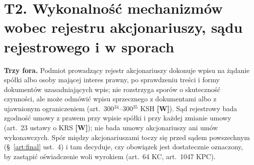 \documentclass[12pt,a4paper]{report}
\newcommand{\Wiar}[1]{\textbf{[#1]}}
\begin{document}
\section*{T2. Wykonalność mechanizmów wobec rejestru akcjonariuszy, sądu rejestrowego i w sporach}

\textbf{Trzy fora.} Podmiot prowadzący rejestr akcjonariuszy dokonuje wpisu na żądanie spółki albo osoby mającej interes prawny, po sprawdzeniu treści i formy dokumentów uzasadniających wpis; nie rozstrzyga sporów o skuteczność czynności, ale może odmówić wpisu sprzecznego z dokumentami albo z ujawnionym ograniczeniem (art.~300$^{34}$--300$^{35}$ KSH \Wiar{W}). Sąd rejestrowy bada zgodność umowy z prawem przy wpisie spółki i przy każdej zmianie umowy (art.~23 ustawy o KRS \Wiar{W}); nie bada umowy akcjonariuszy ani umów wykonawczych. Spór między akcjonariuszami toczy się przed sądem powszechnym (§~\ref{art:final} ust.~4) i tam decyduje, czy obowiązek jest dostatecznie oznaczony, by zastąpić oświadczenie woli wyrokiem (art.~64 KC, art.~1047 KPC).
\end{document}
